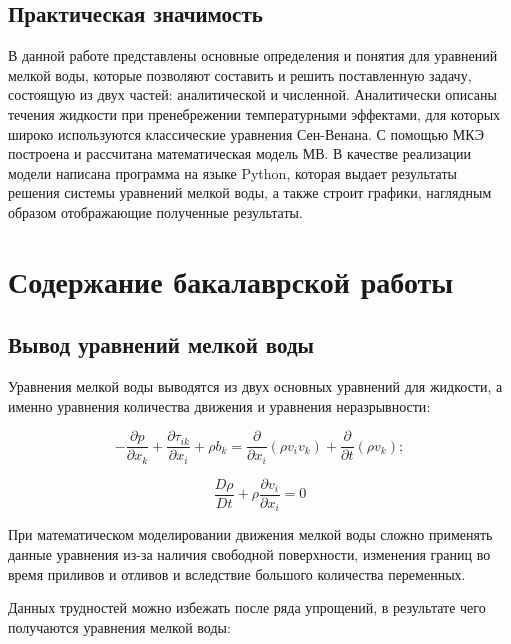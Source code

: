 \documentclass[14pt]{extreport}
\begin{document}
\section{Практическая значимость}
В данной работе представлены основные определения и понятия для уравнений мелкой воды, которые позволяют составить и решить поставленную задачу, состоящую из двух частей: аналитической и численной. Аналитически описаны течения жидкости при пренебрежении температурными эффектами, для которых широко используются классические уравнения Сен-Венана. С помощью МКЭ построена и рассчитана математическая модель МВ. В качестве реализации модели написана программа на языке Python\cite{bib:python:lutz:2013,bib:python:nm:2013}, которая выдает результаты решения системы уравнений мелкой воды, а также строит графики, наглядным образом отображающие полученные результаты.


\chapter{Содержание бакалаврской работы}


\section{Вывод уравнений мелкой воды}

Уравнения мелкой воды выводятся из двух основных уравнений для жидкости, а именно уравнения количества движения и уравнения неразрывности\cite{bib:fem:konor}:

\begin{equation}\label{eq:shallow_water:1}
-\frac{\partial p}{\partial x_k} + \frac{\partial \tau_{ik}}{\partial x_i} + \rho b_k = \frac{\partial}{\partial x_i}(\rho v_i v_k) + \frac{\partial}{\partial t}(\rho v_k);
\end{equation}

\begin{equation}\label{eq:shallow_water:2}
\frac{D\rho}{Dt}+\rho \frac{\partial v_i}{\partial x_i} =0
\end{equation}

При математическом моделировании движения мелкой воды сложно применять данные уравнения из-за наличия свободной поверхности, изменения границ во время приливов и отливов и вследствие большого количества переменных.

Данных трудностей можно избежать после ряда упрощений, в результате чего получаются уравнения мелкой воды:
\end{document}
